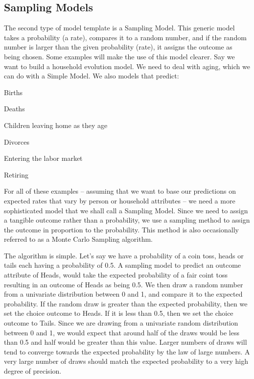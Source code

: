 \subsection{Sampling Models}
The second type of model template is a Sampling Model.  This
generic model takes a probability (a rate), compares it to a
random number, and if the random number is larger than the
given probability (rate), it assigns the outcome as being
chosen.  Some examples will make the use of this model
clearer. Say we want to build a household evolution model.
We need to deal with aging, which we can do with a Simple
Model.  We also models that predict:

\squishlist
\item Births
\item Deaths
\item Children leaving home as they age
\item Divorces
\item Entering the labor market
\item Retiring
\squishend

For all of these examples -- assuming that we want to base
our predictions on expected rates that vary by person or
household attributes -- we need a more sophisticated model
that we shall call a Sampling Model.  Since we need to
assign a tangible outcome rather than a probability, we use
a sampling method to assign the outcome in proportion to the
probability.  This method is also occasionally referred to
as a Monte Carlo Sampling algorithm.

The algorithm is simple.  Let's say we have a probability of
a coin toss, heads or tails each having a probability of
0.5.  A sampling model to predict an outcome attribute of
Heads, would take the expected probability of a fair coint
toss resulting in an outcome of Heads as being 0.5.  We then
draw a random number from a univariate distribution between
0 and 1, and compare it to the expected probability. If the
random draw is greater than the expected probability, then
we set the choice outcome to Heads.  If it is less than 0.5,
then we set the choice outcome to Tails.  Since we are
drawing from a univariate random distribution between 0 and
1, we would expect that around half of the draws would be
less than 0.5 and half would be greater than this value.
Larger numbers of draws will tend to converge towards the
expected probability by the law of large numbers.  A very
large number of draws should match the expected probability
to a very high degree of precision.

